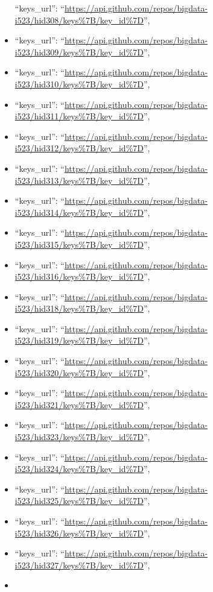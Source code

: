 \begin{itemize}
  ``keys\_url'':
  ``\url{https://api.github.com/repos/bigdata-i523/hid308/keys\%7B/key_id\%7D}'',
\item
  ``keys\_url'':
  ``\url{https://api.github.com/repos/bigdata-i523/hid309/keys\%7B/key_id\%7D}'',
\item
  ``keys\_url'':
  ``\url{https://api.github.com/repos/bigdata-i523/hid310/keys\%7B/key_id\%7D}'',
\item
  ``keys\_url'':
  ``\url{https://api.github.com/repos/bigdata-i523/hid311/keys\%7B/key_id\%7D}'',
\item
  ``keys\_url'':
  ``\url{https://api.github.com/repos/bigdata-i523/hid312/keys\%7B/key_id\%7D}'',
\item
  ``keys\_url'':
  ``\url{https://api.github.com/repos/bigdata-i523/hid313/keys\%7B/key_id\%7D}'',
\item
  ``keys\_url'':
  ``\url{https://api.github.com/repos/bigdata-i523/hid314/keys\%7B/key_id\%7D}'',
\item
  ``keys\_url'':
  ``\url{https://api.github.com/repos/bigdata-i523/hid315/keys\%7B/key_id\%7D}'',
\item
  ``keys\_url'':
  ``\url{https://api.github.com/repos/bigdata-i523/hid316/keys\%7B/key_id\%7D}'',
\item
  ``keys\_url'':
  ``\url{https://api.github.com/repos/bigdata-i523/hid318/keys\%7B/key_id\%7D}'',
\item
  ``keys\_url'':
  ``\url{https://api.github.com/repos/bigdata-i523/hid319/keys\%7B/key_id\%7D}'',
\item
  ``keys\_url'':
  ``\url{https://api.github.com/repos/bigdata-i523/hid320/keys\%7B/key_id\%7D}'',
\item
  ``keys\_url'':
  ``\url{https://api.github.com/repos/bigdata-i523/hid321/keys\%7B/key_id\%7D}'',
\item
  ``keys\_url'':
  ``\url{https://api.github.com/repos/bigdata-i523/hid323/keys\%7B/key_id\%7D}'',
\item
  ``keys\_url'':
  ``\url{https://api.github.com/repos/bigdata-i523/hid324/keys\%7B/key_id\%7D}'',
\item
  ``keys\_url'':
  ``\url{https://api.github.com/repos/bigdata-i523/hid325/keys\%7B/key_id\%7D}'',
\item
  ``keys\_url'':
  ``\url{https://api.github.com/repos/bigdata-i523/hid326/keys\%7B/key_id\%7D}'',
\item
  ``keys\_url'':
  ``\url{https://api.github.com/repos/bigdata-i523/hid327/keys\%7B/key_id\%7D}'',
\item

\end{itemize}
